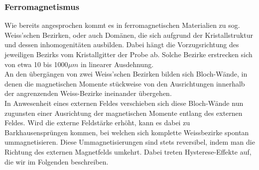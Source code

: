         \subsubsection*{Ferromagnetismus}
            Wie bereits angesprochen kommt es in ferromagnetischen Materialien zu sog. Weiss'schen Bezirken,
            oder auch Domänen, die sich aufgrund der Kristallstruktur und dessen inhomogenitäten ausbilden. Dabei
            hängt die Vorzugsrichtung des jeweiligen Bezirks vom Kristallgitter der Probe ab. Solche
            Bezirke erstrecken sich von etwa 10 bis 1000$\mu m$ in linearer Ausdehnung.\\
            An den übergängen von zwei Weiss'schen Bezirken bilden sich Bloch-Wände, in denen die magnetischen Momente stückweise von den Ausrichtungen innerhalb der angrenzenden Weiss-Bezirke ineinander übergehen.\\
            In Anwesenheit eines externen Feldes verschieben sich diese Bloch-Wände nun zugunsten einer Ausrichtung der magnetischen Momente entlang des externen Feldes. Wird die externe Feldstärke erhöht, kann es dabei zu Barkhausensprüngen kommen, bei welchen sich komplette Weissbezirke spontan ummagnetisieren. Diese Ummagnetisierungen sind stets reversibel, indem man die Richtung des externen Magnetfelds umkehrt. Dabei treten Hysterese-Effekte auf, die wir im Folgenden beschreiben.
